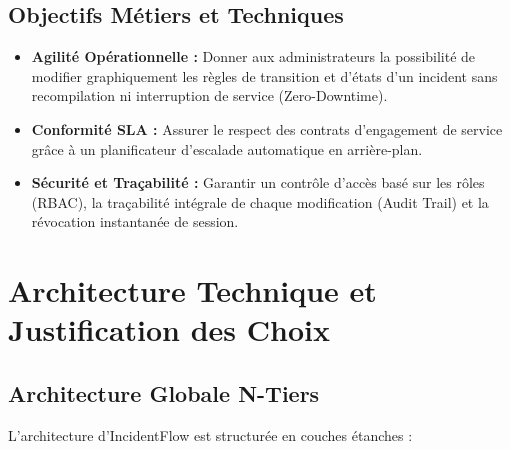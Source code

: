 \documentclass[12pt,a4paper]{article}
\begin{document}
\subsection{Objectifs Métiers et Techniques}
\begin{itemize}
    \item \textbf{Agilité Opérationnelle :} Donner aux administrateurs la possibilité de modifier graphiquement les règles de transition et d'états d'un incident sans recompilation ni interruption de service (Zero-Downtime).
    \item \textbf{Conformité SLA :} Assurer le respect des contrats d'engagement de service grâce à un planificateur d'escalade automatique en arrière-plan.
    \item \textbf{Sécurité et Traçabilité :} Garantir un contrôle d'accès basé sur les rôles (RBAC), la traçabilité intégrale de chaque modification (Audit Trail) et la révocation instantanée de session.
\end{itemize}

\clearpage

\section{Architecture Technique et Justification des Choix}

\subsection{Architecture Globale N-Tiers}
L'architecture d'IncidentFlow est structurée en couches étanches :
\end{document}
